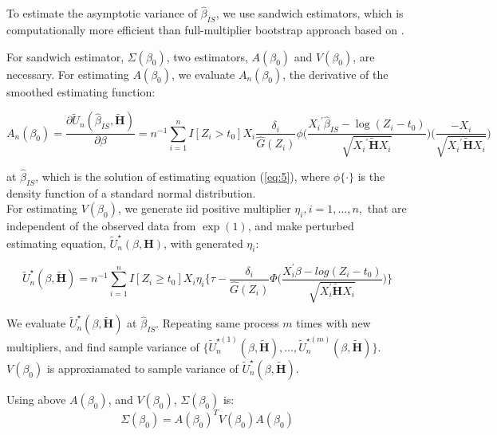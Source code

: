 \documentclass[titlepage,english,12pt]{article}
\begin{document}
	\noindent To estimate the asymptotic variance of $\hat{\beta}_{IS}$, we use sandwich estimators, which is computationally more efficient than full-multiplier bootstrap approach based on \citet{chiou2015semiparametric}. 
	
	\noindent For sandwich estimator, $\Sigma(\beta_0)$, two estimators, $A(\beta_0)$ and $V(\beta_0)$, are necessary. For estimating $A(\beta_0)$, 
	we evaluate $A_n(\beta_0)$, the derivative of the smoothed estimating function:
	
	\begin{equation} \label{eq:6}
	A_n(\beta_0) = \frac{\partial \tilde{U}_n(\hat{\beta}_{IS}, \tilde{\textbf{H}})}{\partial \beta} = n^{-1}\sum_{i=1}^{n} I[Z_i>t_0] X_i \frac{\delta_i}{\hat{G}(Z_i)} \phi\bigg(\frac{{X_i}^{\prime}\hat{\beta}_{IS}-\log(Z_i-t_0)}{\sqrt{{X_i}^{\prime}\tilde{\textbf{H}} X_i}}\bigg)\bigg(\frac{-{X_i}}{\sqrt{{X_i}^{\prime} \tilde{\textbf{H}} {X_i}}}\bigg)
	\end{equation}
	
	\noindent at $\hat{\beta}_{IS}$, which is the solution of estimating equation (\ref{eq:5}), where $\phi \{ \cdot \}$ is the density function of a standard normal distribution.\\
	
	\noindent For estimating $V(\beta_0)$, we generate iid positive multiplier $\eta_i, i=1,...,n,$ that are independent of the observed data from $\exp(1)$, and make perturbed estimating equation, $\tilde{U}^{\star}_n(\beta, \textbf{H})$, with generated $\eta_i$:
	
	\begin{equation} \label{eq:7}
	\tilde{U}^{\star}_n(\beta, \tilde{\textbf{H}}) = n^{-1} \sum_{i=1}^{n} I[Z_i \geq t_0] X_i \eta_i \Big\{\tau - \frac{\delta_i}{\hat{G}(Z_i)}\Phi\Big(\frac{X_i^\prime\beta-log(Z_i-t_0)}{\sqrt{X_i^{\prime} \tilde{\textbf{H}} X_{i}}}\Big)\Big\}
	\end{equation}
	
	\noindent We evaluate $\tilde{U}^{\star}_n(\beta, \tilde{\textbf{H}})$ at $\hat{\beta}_{IS}$. Repeating same process $m$ times with new multipliers, and find sample variance of $\{\tilde{U}^{\star (1)}_n(\beta, \tilde{\textbf{H}}),..., \tilde{U}^{\star (m)}_n(\beta, \tilde{\textbf{H}})\}$. $V(\beta_0)$ is approxiamated to sample variance of $\tilde{U}^{\star}_n(\beta, \tilde{\textbf{H}})$.
	
	\noindent Using above $A(\beta_0)$, and $V(\beta_0)$, $\Sigma(\beta_0)$ is:
	\begin{equation} \label{eq:8}
	\Sigma(\beta_0) = A(\beta_0)^T V(\beta_0) A(\beta_0)
	\end{equation}
	
\end{document}
